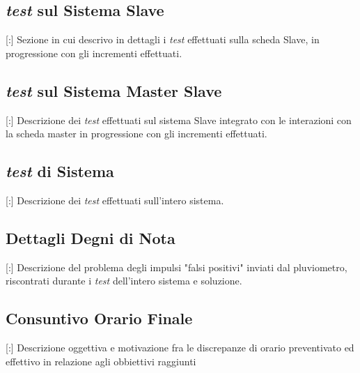 \subsection{\textit{test} sul Sistema Slave}

[:] Sezione in cui descrivo in dettagli i \textit{test} effettuati sulla scheda Slave, in progressione con gli incrementi effettuati.

\subsection{\textit{test} sul Sistema Master Slave}

[:] Descrizione dei \textit{test} effettuati sul sistema Slave integrato con le interazioni con la scheda master in progressione con gli incrementi effettuati.

\subsection{\textit{test} di Sistema}

[:] Descrizione dei \textit{test} effettuati sull'intero sistema.

\subsection{Dettagli Degni di Nota}

[:] Descrizione del problema degli impulsi "falsi positivi" inviati dal pluviometro, riscontrati durante i \textit{test} dell'intero sistema e soluzione.

\subsection{Consuntivo Orario Finale}

[:] Descrizione oggettiva e motivazione fra le discrepanze di orario preventivato ed effettivo in relazione agli obbiettivi raggiunti